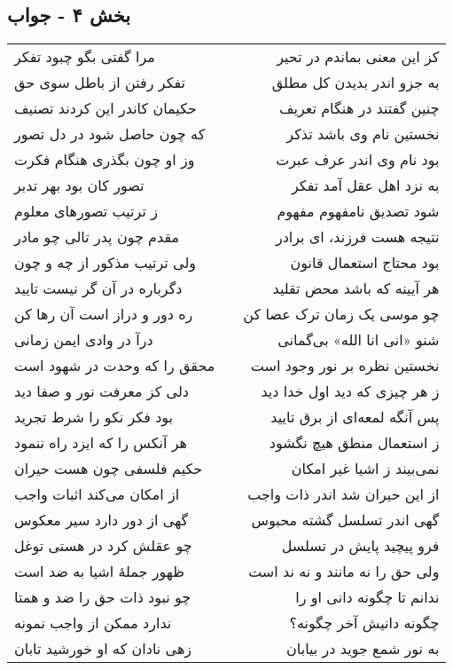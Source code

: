 \begin{center}
\section*{بخش ۴ - جواب}
\label{sec:sh004}
\begin{longtable}{l p{0.5cm} r}
مرا گفتی بگو چبود تفکر
&&
کز این معنی بماندم در تحیر
\\
تفکر رفتن از باطل سوی حق
&&
به جزو اندر بدیدن کل مطلق
\\
حکیمان کاندر این کردند تصنیف
&&
چنین گفتند در هنگام تعریف
\\
که چون حاصل شود در دل تصور
&&
نخستین نام وی باشد تذکر
\\
وز او چون بگذری هنگام فکرت
&&
بود نام وی اندر عرف عبرت
\\
تصور کان بود بهر تدبر
&&
به نزد اهل عقل آمد تفکر
\\
ز ترتیب تصورهای معلوم
&&
شود تصدیق نامفهوم مفهوم
\\
مقدم چون پدر تالی چو مادر
&&
نتیجه هست فرزند، ای برادر
\\
ولی ترتیب مذکور از چه و چون
&&
بود محتاج استعمال قانون
\\
دگرباره در آن گر نیست تایید
&&
هر آیینه که باشد محض تقلید
\\
ره دور و دراز است آن رها کن
&&
چو موسی یک زمان ترک عصا کن
\\
درآ در وادی ایمن زمانی
&&
شنو «انی انا الله» بی‌گمانی
\\
محقق را که وحدت در شهود است
&&
نخستین نظره بر نور وجود است
\\
دلی کز معرفت نور و صفا دید
&&
ز هر چیزی که دید اول خدا دید
\\
بود فکر نکو را شرط تجرید
&&
پس آنگه لمعه‌ای از برق تایید
\\
هر آنکس را که ایزد راه ننمود
&&
ز استعمال منطق هیچ نگشود
\\
حکیم فلسفی چون هست حیران
&&
نمی‌بیند ز اشیا غیر امکان
\\
از امکان می‌کند اثبات واجب
&&
از این حیران شد اندر ذات واجب
\\
گهی از دور دارد سیر معکوس
&&
گهی اندر تسلسل گشته محبوس
\\
چو عقلش کرد در هستی توغل
&&
فرو پیچید پایش در تسلسل
\\
ظهور جملهٔ اشیا به ضد است
&&
ولی حق را نه مانند و نه ند است
\\
چو نبود ذات حق را ضد و همتا
&&
ندانم تا چگونه دانی او را
\\
ندارد ممکن از واجب نمونه
&&
چگونه دانیش آخر چگونه؟
\\
زهی نادان که او خورشید تابان
&&
به نور شمع جوید در بیابان
\\
\end{longtable}
\end{center}
